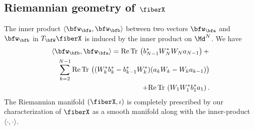 \subsection{Riemannian geometry of $\fiberX$}
\label{subsec:riemann}
The inner product $\langle \bfw_\bfa , \bfw_\bfb \rangle$ between two vectors $\bfw_\bfa$ and $\bfw_\bfb$ in $T_{\bfW}\fiberX$ is induced by the inner product on $\Md^N$. We have
\begin{eqnarray}
    \nonumber
    \lefteqn{\langle \bfw_\bfb, \bfw_\bfa \rangle = \mathrm{Re} \, \Tr\left(b_{N-1}^* W_N^*W_N a_{N-1}\right) + }
    \\  \label{eq:tangent4}
    && \sum_{k=2}^{N-1}\mathrm{Re} \, \Tr \left( (W_k^*b_k^* - b_{k-1}^*W_k^*)    (a_{k}W_{k} - W_{k}a_{k-1}) \right) 
    \\ \nonumber
    && + \mathrm{Re} \, \Tr\left(W_1 W_1^* b_1^* a_1 \right).
\end{eqnarray}
The Riemannian manifold $(\fiberX,\iota)$ is completely prescribed by our characterization of $\fiberX$ as a smooth manifold along with the inner-product $\langle \cdot, \cdot \rangle$. 

